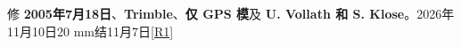 \documentclass[11pt,a4paper]{article}
\numberwithin{equation}{section}
\numberwithin{figure}{section}
\begin{document}
{\cjkfont 修}\allowbreak{} \textbf{2005{\cjkfont 年}\allowbreak{}7{\cjkfont 月}\allowbreak{}18{\cjkfont 日}\allowbreak{}}{\cjkfont 、}\allowbreak{}\textbf{Trimble}{\cjkfont 、}\allowbreak{}\textbf{{\cjkfont 仅}\allowbreak{} GPS {\cjkfont 模}\allowbreak{}}{\cjkfont 及}\allowbreak{} \textbf{U. Vollath {\cjkfont 和}\allowbreak{} S. Klose}{\cjkfont 。}\allowbreak{}2026{\cjkfont 年}\allowbreak{}11{\cjkfont 月}\allowbreak{}10{\cjkfont 日}\allowbreak{}20 mm{\cjkfont 结}\allowbreak{}11{\cjkfont 月}\allowbreak{}7{\cjkfont 日}\allowbreak{}\hyperlink{ref-R1}{[R1]}
\end{document}
